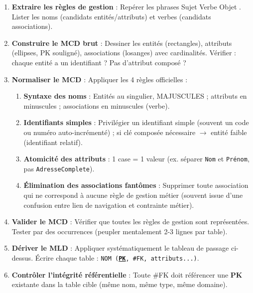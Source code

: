 \documentclass[11pt]{article}
\begin{document}
\begin{methode}
\begin{enumerate}
    \item \textbf{Extraire les règles de gestion} : Repérer les phrases \og Sujet Verbe Objet \fg. Lister les noms (candidats entités/attributs) et verbes (candidats associations).
    \item \textbf{Construire le MCD brut} : Dessiner les entités (rectangles), attributs (ellipses, PK souligné), associations (losanges) avec cardinalités. Vérifier : chaque entité a un identifiant ? Pas d'attribut composé ?
    \item \textbf{Normaliser le MCD} : Appliquer les 4 règles officielles :
        \begin{enumerate}
            \item \textbf{Syntaxe des noms} : Entités au singulier, MAJUSCULES ; attributs en minuscules ; associations en minuscules (verbe).
            \item \textbf{Identifiants simples} : Privilégier un identifiant simple (souvent un code ou numéro auto-incrémenté) ; si clé composée nécessaire $\rightarrow$ entité faible (identifiant relatif).
            \item \textbf{Atomicité des attributs} : 1 case = 1 valeur (ex. séparer \texttt{Nom} et \texttt{Prénom}, pas \texttt{AdresseComplete}).
            \item \textbf{Élimination des associations fantômes} : Supprimer toute association qui ne correspond à aucune règle de gestion métier (souvent issue d'une confusion entre lien de navigation et contrainte métier).
        \end{enumerate}
    \item \textbf{Valider le MCD} : Vérifier que toutes les règles de gestion sont représentées. Tester par des occurrences (peupler mentalement 2-3 lignes par table).
    \item \textbf{Dériver le MLD} : Appliquer systématiquement le tableau de passage ci-dessus. Écrire chaque table : \texttt{NOM (\textbf{\underline{PK}}, \#FK, attributs...)}.
    \item \textbf{Contrôler l'intégrité référentielle} : Toute \#FK doit référencer une \textbf{PK} existante dans la table cible (même nom, même type, même domaine).
\end{enumerate}
\end{methode}
\end{document}
